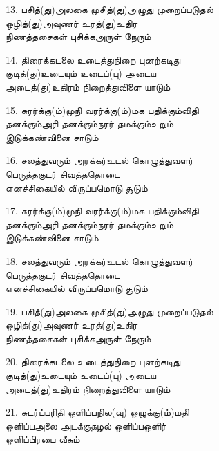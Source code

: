13. பசித்(து)அலகை முசித்(து)அழுது முறைப்படுதல்\\
         ஒழித்(து)அவுணர் உரத்(து)உதிர\\
         நிணத்தசைகள் புசிக்கஅருள் நேரும் \thiru



14. திரைக்கடலை உடைத்துநிறை புனற்கடிது\\
         குடித்(து)உடையும் உடைப்(பு) அடைய\\
         அடைத்(து)உதிரம் நிறைத்துவிளை யாடும் \thiru



15. சுரர்க்கு(ம்)முநி வரர்க்கு(ம்)மக பதிக்கும்விதி\\
         தனக்கும்அரி தனக்கும்நரர் தமக்கும்உறும்\\
         இடுக்கண்வினை சாடும் \thiru



16. சலத்துவரும் அரக்கர்உடல் கொழுத்துவளர்\\
         பெருத்தகுடர் சிவத்ததொடை\\
         எனச்சிகையில் விருப்பமொடு சூடும் \thiru



17. சுரர்க்கு(ம்)முநி வரர்க்கு(ம்)மக பதிக்கும்விதி\\
         தனக்கும்அரி தனக்கும்நரர் தமக்கும்உறும்\\
         இடுக்கண்வினை சாடும் \thiru



18. சலத்துவரும் அரக்கர்உடல் கொழுத்துவளர்\\
         பெருத்தகுடர் சிவத்ததொடை\\
         எனச்சிகையில் விருப்பமொடு சூடும் \thiru



19. பசித்(து)அலகை முசித்(து)அழுது முறைப்படுதல்\\
         ஒழித்(து)அவுணர் உரத்(து)உதிர\\
         நிணத்தசைகள் புசிக்கஅருள் நேரும் \thiru



20. திரைக்கடலை உடைத்துநிறை புனற்கடிது\\
         குடித்(து)உடையும் உடைப்(பு) அடைய\\
         அடைத்(து)உதிரம் நிறைத்துவிளை யாடும் \thiru



21. சுடர்ப்பரிதி ஒளிப்பநில(வு) ஒழுக்கு(ம்)மதி\\
         ஒளிப்பஅலை அடக்குதழல் ஒளிப்பஒளிர்\\
         ஒளிப்பிரபை வீசும் \thiru



